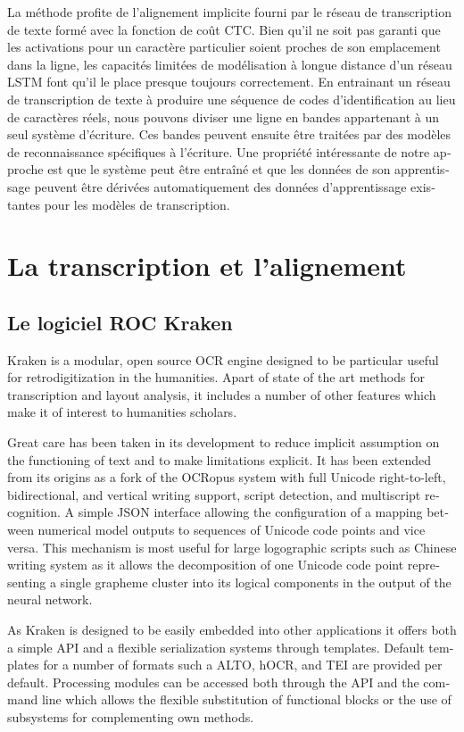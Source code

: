 \begin{french}
La méthode profite de l'alignement implicite fourni par le réseau de
transcription de texte formé avec la fonction de coût CTC.  Bien qu'il ne soit
pas garanti que les activations pour un caractère particulier soient proches de
son emplacement dans la ligne, les capacités limitées de modélisation à longue
distance d'un réseau LSTM font qu'il le place presque toujours correctement.
En entrainant un réseau de transcription de texte à produire une séquence de
codes d'identification au lieu de caractères réels, nous pouvons diviser une
ligne en bandes appartenant à un seul système d'écriture. Ces bandes peuvent
ensuite être traitées par des modèles de reconnaissance spécifiques à
l'écriture. Une propriété intéressante de notre approche est que le système
peut être entraîné et que les données de son apprentissage peuvent être
dérivées automatiquement des données d'apprentissage existantes pour les
modèles de transcription.

\section{La transcription et l'alignement}

\subsection{Le logiciel ROC Kraken}

Kraken is a modular, open source OCR engine designed to be particular useful
for retrodigitization in the humanities. Apart of state of the art
methods for transcription and layout analysis, it includes a number of other
features which make it of interest to humanities scholars. 

Great care has been taken in its development to reduce implicit assumption on
the functioning of text and to make limitations explicit. It has been extended
from its origins as a fork of the OCRopus system with full Unicode
right-to-left, bidirectional, and vertical writing support, script detection,
and multiscript recognition. A simple JSON interface allowing the configuration
of a mapping between numerical model outputs to sequences of Unicode code
points and vice versa. This mechanism is most useful for large logographic
scripts such as Chinese writing system as it allows the decomposition of one
Unicode code point representing a single grapheme cluster into its logical
components in the output of the neural network.

As Kraken is designed to be easily embedded into other applications it offers
both a simple API and a flexible serialization systems through templates.
Default templates for a number of formats such a ALTO, hOCR, and TEI are
provided per default. Processing modules can be accessed both through the API
and the command line which allows the flexible substitution of functional
blocks or the use of subsystems for complementing own methods.


\end{french}
